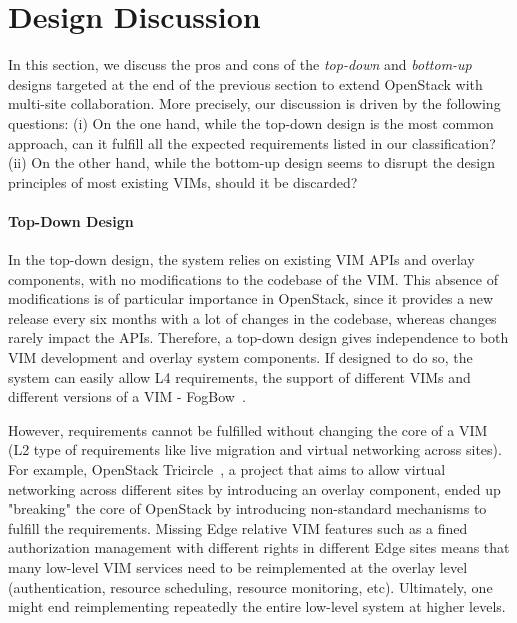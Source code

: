

\section{Design Discussion}
\label{sec:design_discussion}

In this section, we discuss the pros and cons of the \emph{top-down} and
\emph{bottom-up} designs targeted at the end of the previous section to extend
OpenStack with multi-site collaboration. More precisely, our discussion is
driven by the following questions: (i) On the one hand, while the top-down
design is the most common approach, can it fulfill all the expected
requirements listed in our classification? (ii) On the other hand, while the
bottom-up design seems to disrupt the design principles of most existing VIMs,
should it be discarded?
 
\paragraph{Top-Down Design}
In the top-down design, the system relies on existing VIM APIs and overlay
components, with no modifications to the codebase of the VIM. This
absence of modifications is of particular importance in OpenStack,
since it provides a new release every six months with a lot of changes
in the codebase, whereas changes rarely impact the APIs. Therefore, a
top-down design gives independence to both VIM development and overlay
system components. If designed to do so, the system can easily allow
L4 requirements, \ie the support of different VIMs and different
versions of a VIM - \eg FogBow~\cite{brasileiro2016fogbow}.

However, requirements cannot be fulfilled without changing the core of
a VIM (\eg L2 type of requirements like live migration and virtual
networking across sites). For example, OpenStack
Tricircle~\cite{tricircle}, a project that aims to allow virtual
networking across different sites by introducing an overlay component,
ended up "breaking" the core of OpenStack by introducing non-standard
mechanisms to fulfill the requirements. Missing Edge relative VIM
features such as a fined authorization management with different
rights in different Edge sites means that many low-level VIM services
need to be reimplemented at the overlay level (\eg authentication,
resource scheduling, resource monitoring, etc). Ultimately, one might
end reimplementing repeatedly the entire low-level system at higher
levels.

